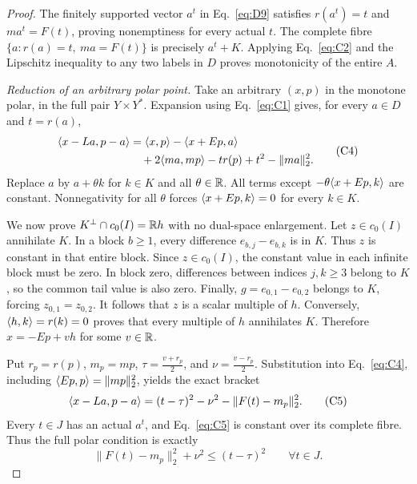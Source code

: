 \begin{proof}
The finitely supported vector $a^t$ in Eq.~\eqref{eq:D9} satisfies $r(a^t)=t$ and
$ma^t=F(t)$, proving nonemptiness for every actual $t$. The complete
fibre $\{a:r(a)=t,\ ma=F(t)\}$ is precisely $a^t+K$.
Applying Eq.~\eqref{eq:C2} and the Lipschitz inequality to any two labels
in $D$ proves monotonicity of the entire $A$.

\noindent\textit{Reduction of an arbitrary polar point.}
\label{sec:C3}
Take an arbitrary $(x,p)$ in the monotone polar, in the full pair
$Y\times Y^*$. Expansion using Eq.~\eqref{eq:C1} gives, for every
$a\in D$ and $t=r(a)$,
\begin{equation}
\begin{aligned}
\langle x-La,p-a\rangle
 &=\langle x,p\rangle-\langle x+Ep,a\rangle\\
 &\quad+2\langle ma,mp\rangle-t r(p)+t^2-\|ma\|_2^2.
\end{aligned}
\tag{C4}\label{eq:C4}
\end{equation}
Replace $a$ by $a+\theta k$ for $k\in K$ and all $\theta\in\mathbb R$.
All terms except $-\theta\langle x+Ep,k\rangle$ are constant.
Nonnegativity for all $\theta$ forces $\langle x+Ep,k\rangle=0$ for every $k\in K$.

We now prove $K^\perp\cap c_0(I)=\mathbb R h$ with no dual-space enlargement.
Let $z\in c_0(I)$ annihilate $K$. In a block $b\ge1$, every
difference $e_{b,j}-e_{b,k}$ is in $K$. Thus $z$ is constant in that
entire block. Since $z\in c_0(I)$, the constant value in each infinite
block must be zero. In block
zero, differences between indices $j,k\ge3$ belong to $K$, so the common
tail value is also zero. Finally, $g=e_{0,1}-e_{0,2}$ belongs to $K$,
forcing $z_{0,1}=z_{0,2}$. It follows that $z$ is a scalar multiple of
$h$. Conversely, $\langle h,k\rangle=r(k)=0$ proves that every multiple of $h$
annihilates $K$. Therefore $x=-Ep+vh$ for some $v\in\mathbb R$.

Put $r_p=r(p)$, $m_p=mp$, $\tau=\frac{v+r_p}{2}$, and $\nu=\frac{v-r_p}{2}$.
Substitution into Eq.~\eqref{eq:C4}, including
$\langle Ep,p\rangle=\|mp\|_2^2$, yields the exact bracket
\begin{equation}
\langle x-La,p-a\rangle
 =(t-\tau)^2-\nu^2-\|F(t)-m_p\|_2^2.
\tag{C5}\label{eq:C5}
\end{equation}
Every $t\in J$ has an actual $a^t$, and Eq.~\eqref{eq:C5} is constant
over its complete fibre. Thus the full polar condition is exactly
\begin{equation}
\|F(t)-m_p\|_2^2+\nu^2\le(t-\tau)^2
\qquad\forall t\in J.
\tag{C6}\label{eq:C6}
\end{equation}


\end{proof}
